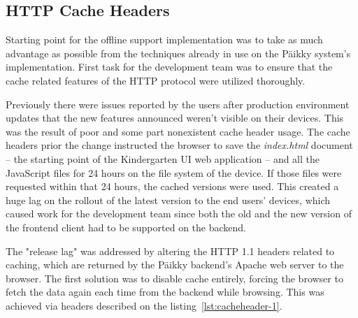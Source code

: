 \subsection{HTTP Cache Headers}
\label{subsec:cacheheaders}


Starting point for the offline support implementation was to take as much advantage as possible from the techniques already in use on the Päikky system's implementation. First task for the development team was to ensure that the cache related features of the HTTP protocol were utilized thoroughly.

Previously there were issues reported by the users after production environment updates that the new features announced weren't visible on their devices. This was the result of poor and some part nonexistent cache header usage. The cache headers prior the change instructed the browser to save the \textit{index.html} document – the starting point of the Kindergarten UI web application – and all the JavaScript files for 24 hours on the file system of the device. If those files were requested within that 24 hours, the cached versions were used. This created a huge lag on the rollout of the latest version to the end users' devices, which caused work for the development team since both the old and the new version of the frontend client had to be supported on the backend.

The "release lag" was addressed by altering the HTTP 1.1 headers related to caching, which are returned by the Päikky backend's Apache web server to the browser. The first solution was to disable cache entirely, forcing the browser to fetch the data again each time from the backend while browsing. This was achieved via headers described on the listing~\ref{lst:cacheheader-1}.

